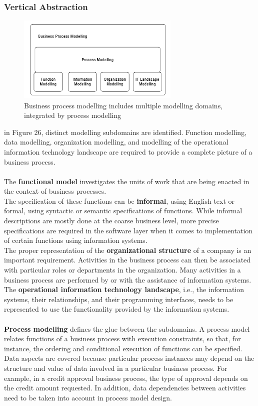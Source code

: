 \documentclass[10pt,a4paper]{article}
\begin{document}
\subsubsection{Vertical Abstraction}
\begin{figure}[ht!]
 \hfill \includegraphics[width=220pt]{images/vertical-abstraction}\hspace*{\fill}
 \caption{Business process modelling includes multiple modelling domains, integrated by process modelling}
  \label{fig:va}
\end{figure}
in Figure 26, distinct modelling subdomains are identified. Function modelling, data modelling, organization modelling, and modelling of the operational information technology landscape are required to provide a complete picture of a business process.  \\ \\
The \textbf{functional model} investigates the units of work that are being enacted in the context of business processes. \\ The specification of these functions can be \textbf{informal}, using English text or formal, using syntactic or semantic specifications of functions. While informal descriptions are mostly done at the coarse business level, more precise specifications are required in the software layer when it comes to implementation of certain functions using information systems. \\ The proper representation of the \textbf{organizational structure} of a company is an important requirement. Activities in the business process can then be associated with particular roles or departments in the organization. Many activities in a business process are performed by or with the assistance of information systems. \\ The \textbf{operational information technology landscape}, i.e., the information systems, their relationships, and their programming interfaces, needs to be represented to use the functionality provided by the information systems. \\ \\
\textbf{Process modelling} defines the glue between the subdomains. A process model relates functions of a business process with execution constraints, so that, for instance, the ordering and conditional execution of functions can be specified. Data aspects are covered because particular process instances may depend on the structure and value of data involved in a particular business process. For example, in a credit approval business process, the type of approval depends on the credit amount requested. In addition, data dependencies between activities need to be taken into account in process model design.
\end{document}
